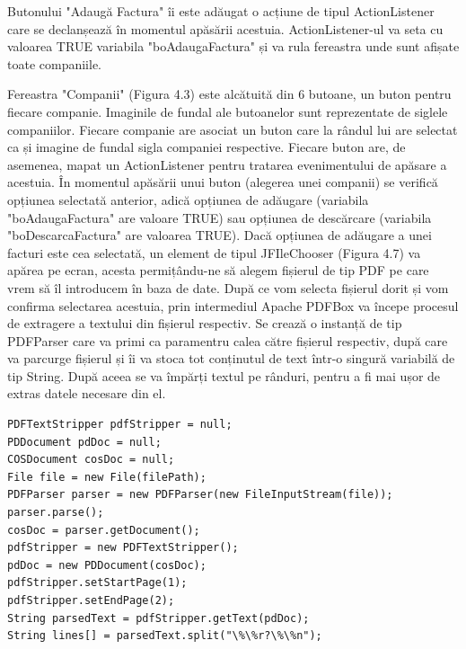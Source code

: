\documentclass[12pt]{book}
\begin{document}
Butonului "Adaugă Factura" îi este adăugat o acțiune de tipul ActionListener care se declanșează în momentul apăsării acestuia. ActionListener-ul va seta cu valoarea TRUE variabila "boAdaugaFactura" și va rula fereastra unde sunt afișate toate companiile.

Fereastra "Companii" (Figura 4.3) este alcătuită din 6 butoane, un buton pentru fiecare companie. Imaginile de fundal ale butoanelor sunt reprezentate de siglele companiilor. Fiecare companie are asociat un buton care la rândul lui are selectat ca și imagine de fundal sigla companiei respective. Fiecare buton are, de asemenea, mapat un ActionListener pentru tratarea evenimentului de apăsare a acestuia.  În momentul apăsării unui buton (alegerea unei companii) se verifică opțiunea selectată anterior, adică opțiunea de adăugare (variabila "boAdaugaFactura" are valoare TRUE) sau opțiunea de descărcare (variabila "boDescarcaFactura" are valoarea TRUE). Dacă opțiunea de adăugare a unei facturi este cea selectată, un element de tipul JFIleChooser (Figura 4.7) va apărea pe ecran, acesta permițându-ne să alegem fișierul de tip PDF pe care vrem să îl introducem în baza de date. 
După ce vom selecta fișierul dorit și vom confirma selectarea acestuia, prin intermediul Apache PDFBox va începe procesul de extragere a textului din fișierul respectiv. Se crează o instanță de tip PDFParser care va primi ca paramentru calea către fișierul respectiv, după care va parcurge fișierul și îi va stoca tot conținutul de text într-o singură variabilă de tip String. După aceea se va împărți textul pe rânduri, pentru a fi mai ușor de extras datele necesare din el.
\begin{lstlisting}[frame=single, caption=Extragerea textului dintr-un fișier de tip PDF]
PDFTextStripper pdfStripper = null;
PDDocument pdDoc = null;
COSDocument cosDoc = null;
File file = new File(filePath);
PDFParser parser = new PDFParser(new FileInputStream(file));
parser.parse();
cosDoc = parser.getDocument();
pdfStripper = new PDFTextStripper();
pdDoc = new PDDocument(cosDoc);
pdfStripper.setStartPage(1);
pdfStripper.setEndPage(2);
String parsedText = pdfStripper.getText(pdDoc);
String lines[] = parsedText.split("\%\%r?\%\%n");
\end{lstlisting}
\end{document}
